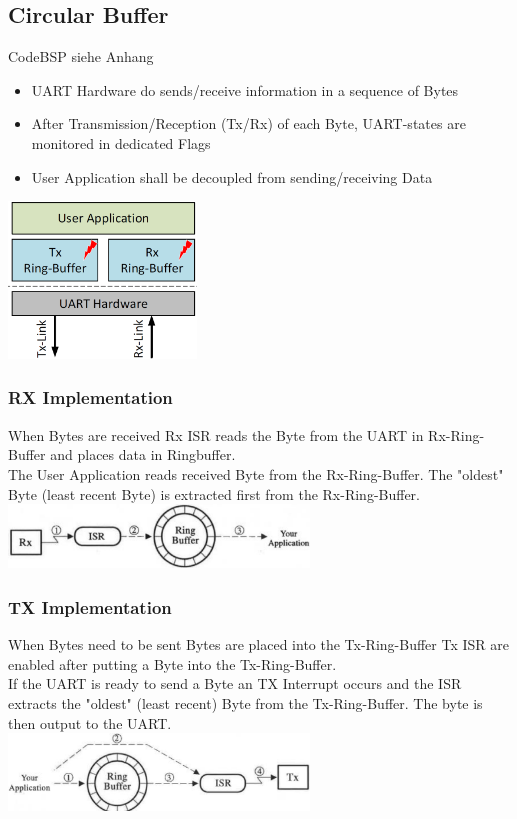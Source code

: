 \begin{minipage}{12cm}
    \subsection{Circular Buffer}
    CodeBSP siehe Anhang \label{CircularBuffer}
	\begin{itemize}
		\item \acs{UART} Hardware do sends/receive information in a sequence of Bytes
		\item After Transmission/Reception (Tx/Rx) of each Byte, \acs{UART}-states are monitored in dedicated Flags
		\item User Application shall be decoupled from sending/receiving Data
	\end{itemize}
\end{minipage}
\begin{minipage}{5cm}
	\includegraphics[width=5cm]{images/ringbuffer}
\end{minipage}
\begin{multicols}{2}
\subsubsection{RX Implementation}
When Bytes are received Rx \acs{ISR} reads the Byte from the \acs{UART} in Rx-Ring-Buffer and places data in Ringbuffer. \\
The User Application reads received Byte from the Rx-Ring-Buffer. The "oldest" Byte (least recent Byte) is extracted first from the Rx-Ring-Buffer.\\
\includegraphics[width=8cm]{images/rx_buffer}
\subsubsection{TX Implementation}
When Bytes need to be sent Bytes are placed into the Tx-Ring-Buffer Tx \acs{ISR} are enabled after putting a Byte into the Tx-Ring-Buffer. \\
If the \acs{UART} is ready to send a Byte an TX Interrupt occurs and the ISR extracts the "oldest" (least recent) Byte from the Tx-Ring-Buffer. The byte is then output to the \acs{UART}.\\
\includegraphics[width=8cm]{images/tx_buffer}
\end{multicols}
\clearpage

